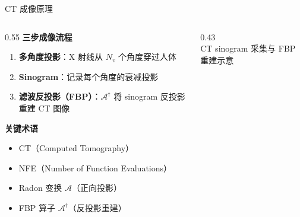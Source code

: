 \documentclass[aspectratio=169,10pt]{beamer}
\begin{document}
\begin{frame}{CT 成像原理}
  \vspace{0.3em}
  \begin{columns}[T]
    \begin{column}{0.55\textwidth}
      \textbf{三步成像流程}
      \begin{enumerate}
        \item \textbf{多角度投影}：X 射线从 $N_v$ 个角度穿过人体
        \item \textbf{Sinogram}：记录每个角度的衰减投影
        \item \textbf{滤波反投影（FBP）}：$\mathcal{A}^\dagger$ 将 sinogram 反投影重建 CT 图像
      \end{enumerate}
      \vspace{0.5em}
      \textbf{关键术语}
      \begin{itemize}
        \item CT（Computed Tomography）
        \item NFE（Number of Function Evaluations）
        \item Radon 变换 $\mathcal{A}$（正向投影）
        \item FBP 算子 $\mathcal{A}^\dagger$（反投影重建）
      \end{itemize}
    \end{column}
    \begin{column}{0.43\textwidth}
      \centering
      \hspace{4pt}%
      \\[3pt]
      \footnotesize\color{InkSoft} CT sinogram 采集与 FBP 重建示意
    \end{column}
  \end{columns}
\end{frame}
\end{document}
